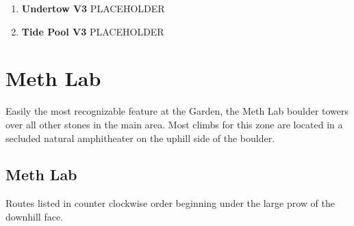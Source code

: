 \label{pt:Undertow}
\begin{enumerate}[resume]
	\item\label{rt:Undertow} \colorbox{green!20}{\textbf{Undertow V3  } }
	\newline PLACEHOLDER\
	\item\label{rt:Tide Pool} \colorbox{green!20}{\textbf{Tide Pool V3  } }
	\newline PLACEHOLDER\
\end{enumerate}
\section{Meth Lab}\label{sa:Meth Lab}
Easily the most recognizable feature at the Garden, the Meth Lab boulder towers over all other stones in the main area. Most climbs for this zone are located in a secluded natural amphitheater on the uphill side of the boulder.

\subsection*{Meth Lab}\label{bf:Meth Lab}
Routes listed in counter clockwise order beginning under the large prow of the downhill face.

